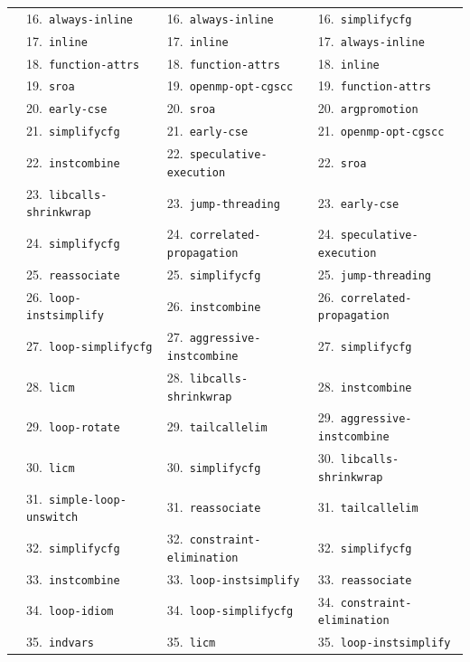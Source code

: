 \documentclass[11pt,a4paper]{article}
\begin{document}
{\begin{longtable}{llll}
 & 16.~\texttt{always-inline} & 16.~\texttt{always-inline} & 16.~\texttt{simplifycfg} \\
 & 17.~\texttt{inline} & 17.~\texttt{inline} & 17.~\texttt{always-inline} \\
 & 18.~\texttt{function-attrs} & 18.~\texttt{function-attrs} & 18.~\texttt{inline} \\
 & 19.~\texttt{sroa} & 19.~\texttt{openmp-opt-cgscc} & 19.~\texttt{function-attrs} \\
 & 20.~\texttt{early-cse} & 20.~\texttt{sroa} & 20.~\texttt{argpromotion} \\
 & 21.~\texttt{simplifycfg} & 21.~\texttt{early-cse} & 21.~\texttt{openmp-opt-cgscc} \\
 & 22.~\texttt{instcombine} & 22.~\texttt{speculative-execution} & 22.~\texttt{sroa} \\
 & 23.~\texttt{libcalls-shrinkwrap} & 23.~\texttt{jump-threading} & 23.~\texttt{early-cse} \\
 & 24.~\texttt{simplifycfg} & 24.~\texttt{correlated-propagation} & 24.~\texttt{speculative-execution} \\
 & 25.~\texttt{reassociate} & 25.~\texttt{simplifycfg} & 25.~\texttt{jump-threading} \\
 & 26.~\texttt{loop-instsimplify} & 26.~\texttt{instcombine} & 26.~\texttt{correlated-propagation} \\
 & 27.~\texttt{loop-simplifycfg} & 27.~\texttt{aggressive-instcombine} & 27.~\texttt{simplifycfg} \\
 & 28.~\texttt{licm} & 28.~\texttt{libcalls-shrinkwrap} & 28.~\texttt{instcombine} \\
 & 29.~\texttt{loop-rotate} & 29.~\texttt{tailcallelim} & 29.~\texttt{aggressive-instcombine} \\
 & 30.~\texttt{licm} & 30.~\texttt{simplifycfg} & 30.~\texttt{libcalls-shrinkwrap} \\
 & 31.~\texttt{simple-loop-unswitch} & 31.~\texttt{reassociate} & 31.~\texttt{tailcallelim} \\
 & 32.~\texttt{simplifycfg} & 32.~\texttt{constraint-elimination} & 32.~\texttt{simplifycfg} \\
 & 33.~\texttt{instcombine} & 33.~\texttt{loop-instsimplify} & 33.~\texttt{reassociate} \\
 & 34.~\texttt{loop-idiom} & 34.~\texttt{loop-simplifycfg} & 34.~\texttt{constraint-elimination} \\
 & 35.~\texttt{indvars} & 35.~\texttt{licm} & 35.~\texttt{loop-instsimplify} \\

\end{longtable}}
\end{document}

